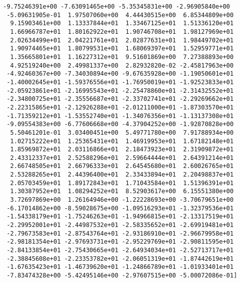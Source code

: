 \documentclass[11pt]{article}
\begin{document}
\begin{Verbatim}[commandchars=\\\{\}]
 -9.75246391e+00 -7.63091465e+00 -5.35345831e+00 -2.96905840e+00
 -5.09631905e-01  1.97507060e+00  4.44430515e+00  6.85344809e+00
  9.15903461e+00  1.13337844e+01  1.33467125e+01  1.51336120e+01
  1.66966787e+01  1.80162922e+01  1.90746708e+01  1.98127969e+01
  2.02634499e+01  2.04221761e+01  2.02877631e+01  1.98449702e+01
  1.90974465e+01  1.80799531e+01  1.68069397e+01  1.52959771e+01
  1.35665801e+01  1.16227312e+01  9.51601869e+00  7.27388893e+00
  4.92519240e+00  2.49981337e+00  2.82932820e-02 -2.45817963e+00
 -4.92460367e+00 -7.34030894e+00 -9.67635928e+00 -1.19050601e+01
 -1.40002645e+01 -1.59376556e+01 -1.76950019e+01 -1.92523833e+01
 -2.05923861e+01 -2.16995543e+01 -2.25478860e+01 -2.31432552e+01
 -2.34800725e+01 -2.35556687e+01 -2.33702741e+01 -2.29269662e+01
 -2.22315865e+01 -2.12926288e+01 -2.01211000e+01 -1.87303570e+01
 -1.71359212e+01 -1.53552740e+01 -1.34076356e+01 -1.13137308e+01
 -9.09554383e+00 -6.77606668e+00 -4.37904252e+00 -1.92870828e+00
  5.50461201e-01  3.03400451e+00  5.49771780e+00  7.91788934e+00
  1.02715222e+01  1.25365431e+01  1.46919953e+01  1.67182148e+01
  1.85969872e+01  2.03116866e+01  2.18473923e+01  2.31909872e+01
  2.43312337e+01  2.52588296e+01  2.59664444e+01  2.64391214e+01
  2.66748505e+01  2.66796333e+01  2.64545680e+01  2.60026765e+01
  2.53288265e+01  2.44396400e+01  2.33433894e+01  2.20498837e+01
  2.05703459e+01  1.89172843e+01  1.71043584e+01  1.51396391e+01
  1.30387952e+01  1.08294252e+01  8.52903617e+00  6.15551380e+00
  3.72697869e+00  1.26164946e+00 -1.22228693e+00 -3.70679651e+00
 -6.17014862e+00 -8.59028675e+00 -1.09516293e+01 -1.32379536e+01
 -1.54338179e+01 -1.75246263e+01 -1.94966815e+01 -2.13317519e+01
 -2.29952001e+01 -2.44987532e+01 -2.58335652e+01 -2.69919481e+01
 -2.79673583e+01 -2.87543764e+01 -2.93186910e+01 -2.96679958e+01
 -2.98181354e+01 -2.97693731e+01 -2.95229769e+01 -2.90811595e+01
 -2.84133854e+01 -2.75430665e+01 -2.64934034e+01 -2.52713717e+01
 -2.38845608e+01 -2.23353782e+01 -2.06051319e+01 -1.87442619e+01
 -1.67635423e+01 -1.46739620e+01 -1.24866789e+01 -1.01933401e+01
 -7.83474328e+00 -5.42495146e+00 -2.97607515e+00 -5.00072086e-01]

    \end{Verbatim}
\end{document}
